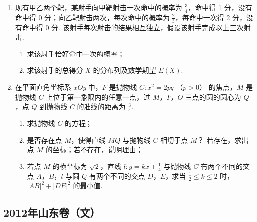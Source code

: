 \begin{description}
\begin{enumerate}[leftmargin=5pt]
        \item 现有甲乙两个靶，某射手向甲靶射击一次命中的概率为 \(\frac{3}{4}\)，命中得 1 分，没有命中得 0 分；向乙靶射击两次，每次命中的概率为 \(\frac{2}{3}\)，每命中一次得 2 分，没有命中得 0 分. 该射手每次射击的结果相互独立，假设该射手完成以上三次射击.
\begin{enumerate}
\item 求该射手恰好命中一次的概率；
\item 求该射手的总得分 \(X\) 的分布列及数学期望 \(E(X)\).
\end{enumerate}

        \item 在平面直角坐标系 \(xOy\) 中，\(F\) 是抛物线 \(C: x^2 = 2py\) （\(p > 0\)） 的焦点，\(M\) 是抛物线 \(C\) 上位于第一象限内的任意一点，过 \(M\)，\(F\)，\(O\) 三点的圆的圆心为 \(Q\)，点 \(Q\) 到抛物线 \(C\) 的准线的距离为 \(\frac{3}{4}\).
\begin{enumerate}
\item 求抛物线 \(C\) 的方程；
\item 是否存在点 \(M\)，使得直线 \(MQ\) 与抛物线 \(C\) 相切于点 \(M\)？ 若存在，求出点 \(M\) 的坐标；若不存在，说明理由；
\item 若点 \(M\) 的横坐标为 \(\sqrt{2}\)，直线 \(l: y = kx + \frac{1}{4}\) 与抛物线 \(C\) 有两个不同的交点 \(A\)，\(B\)，\(l\) 与圆 \(Q\) 有两个不同的交点 \(D\)，\(E\)，求当 \(\frac{1}{2} \leqslant k \leqslant 2\) 时，\(|AB|^2 + |DE|^2\) 的最小值.
\end{enumerate}

    \end{enumerate}

\end{description}


\subsection{2012年山东卷（文）}\label{gk:2012年山东卷（文）}


